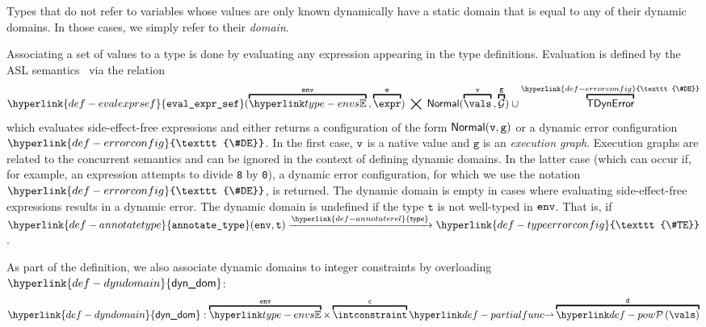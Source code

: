 \documentclass{book}
\newcommand\Normal[0]{\textsf{Normal}}
\newcommand\vg[0]{\texttt{g}}
\newcommand\env[0]{\texttt{env}}
\newcommand\evalexprsef[1]{\hyperlink{def-evalexprsef}{\texttt{eval\_expr\_sef}}(#1)}
\newcommand\XGraphs[0]{\mathcal{G}}
\newcommand\TError[0]{\textsf{TDynError}}
\newcommand\ErrorConfig[0]{\hyperlink{def-errorconfig}{\texttt{\#DE}}}
\newcommand\dynamicdomain[0]{\hyperlink{def-dyndomain}{\textsf{dyn\_dom}}}
\newcommand\TypeErrorConfig[0]{\hyperlink{def-typeerrorconfig}{\texttt{\#TE}}}
\newcommand\annotaterel[0]{\hyperlink{def-annotaterel}{\textsf{type}}}
\newcommand\typearrow[0]{\xrightarrow{\annotaterel}}
\newcommand\annotatetype[1]{\hyperlink{def-annotatetype}{\texttt{annotate\_type}}(#1)}
\newcommand\vc[0]{\texttt{c}}
\newcommand\vt[0]{\texttt{t}}
\begin{document}
Types that do not refer to variables whose values are only known dynamically have
a static domain that is equal to any of their dynamic domains.
In those cases, we simply refer to their \emph{domain}.

Associating a set of values to a type is done by evaluating any expression appearing
in the type definitions. Evaluation is defined by the ASL semantics~\cite{ASLSemanticsReference}
via the relation
\hypertarget{def-evalexprsef}{}
\[
  \evalexprsef{\overname{\envs}{\env} \aslsep \overname{\expr}{\ve}} \;\aslrel\;
  \Normal(\overname{\vals}{\vv}\aslsep\overname{\XGraphs}{\vg}) \cup
  \overname{\TError}{\ErrorConfig}
\]
\hypertarget{def-errorconfig}{}
which evaluates side-effect-free expressions and either returns
a configuration of the form $\Normal(\vv,\vg)$ or a dynamic error configuration $\ErrorConfig$.
In the first case, $\texttt{v}$ is a native value and $\vg$
is an \emph{execution graph}. Execution graphs are related to the concurrent semantics
and can be ignored in the context of defining dynamic domains.
In the latter case (which can occur if, for example, an expression attempts to divide
\texttt{8} by \texttt{0}), a dynamic error configuration, for which we use the notation
$\ErrorConfig$, is returned.
%
The dynamic domain is empty in cases where evaluating side-effect-free expressions
results in a dynamic error.
%
The dynamic domain is undefined if the type $\vt$ is not well-typed in $\texttt{env}$.
That is, if $\annotatetype{\tenv, \vt} \typearrow \TypeErrorConfig$.

As part of the definition, we also associate dynamic domains to integer constraints
by overloading $\dynamicdomain$:
\[
  \dynamicdomain : \overname{\envs}{\env} \times \overname{\intconstraint}{\vc}
  \partialto \overname{\pow{\vals}}{\vd}
\]
\end{document}
